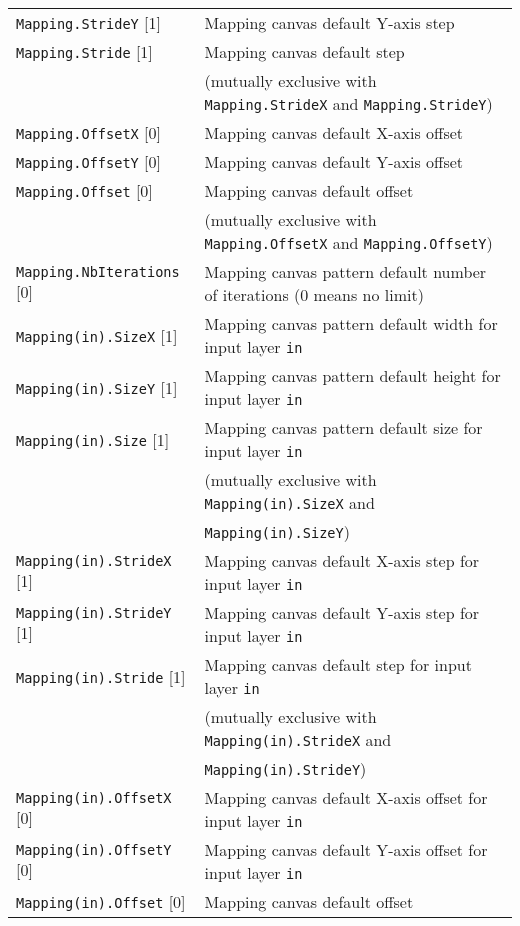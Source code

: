 \documentclass[a4paper,11pt,oneside]{article}
\begin{document}
\begin{center}
\begin{longtable}{| p{5cm} | p{10cm} | }
  \lstinline!Mapping.StrideY! [1] & Mapping canvas default Y-axis step \\
  \lstinline!Mapping.Stride! [1] & Mapping canvas default step \\
   & (mutually exclusive with \lstinline!Mapping.StrideX!
   and \lstinline!Mapping.StrideY!) \\
  \lstinline!Mapping.OffsetX! [0] & Mapping canvas default X-axis offset \\
  \lstinline!Mapping.OffsetY! [0] & Mapping canvas default Y-axis offset \\
  \lstinline!Mapping.Offset! [0] & Mapping canvas default offset \\
   & (mutually exclusive with \lstinline!Mapping.OffsetX!
   and \lstinline!Mapping.OffsetY!) \\
  \lstinline!Mapping.NbIterations! [0] & Mapping canvas pattern default number
  of iterations (0 means no limit) \\
  \lstinline!Mapping(in).SizeX! [1] & Mapping canvas pattern default width
  for input layer \lstinline!in! \\
  \lstinline!Mapping(in).SizeY! [1] & Mapping canvas pattern default height
  for input layer \lstinline!in! \\
  \lstinline!Mapping(in).Size! [1] & Mapping canvas pattern default size
   for input layer \lstinline!in! \\
   & (mutually exclusive with \lstinline!Mapping(in).SizeX! and \\
   & \lstinline!Mapping(in).SizeY!) \\
  \lstinline!Mapping(in).StrideX! [1] & Mapping canvas default X-axis step
  for input layer \lstinline!in! \\
  \lstinline!Mapping(in).StrideY! [1] & Mapping canvas default Y-axis step
  for input layer \lstinline!in! \\
  \lstinline!Mapping(in).Stride! [1] & Mapping canvas default step
   for input layer \lstinline!in! \\
   & (mutually exclusive with \lstinline!Mapping(in).StrideX! and \\
   & \lstinline!Mapping(in).StrideY!) \\
  \lstinline!Mapping(in).OffsetX! [0] & Mapping canvas default X-axis offset
  for input layer \lstinline!in! \\
  \lstinline!Mapping(in).OffsetY! [0] & Mapping canvas default Y-axis offset
  for input layer \lstinline!in! \\
  \lstinline!Mapping(in).Offset! [0] & Mapping canvas default offset

\end{longtable}
\end{center}
\end{document}

